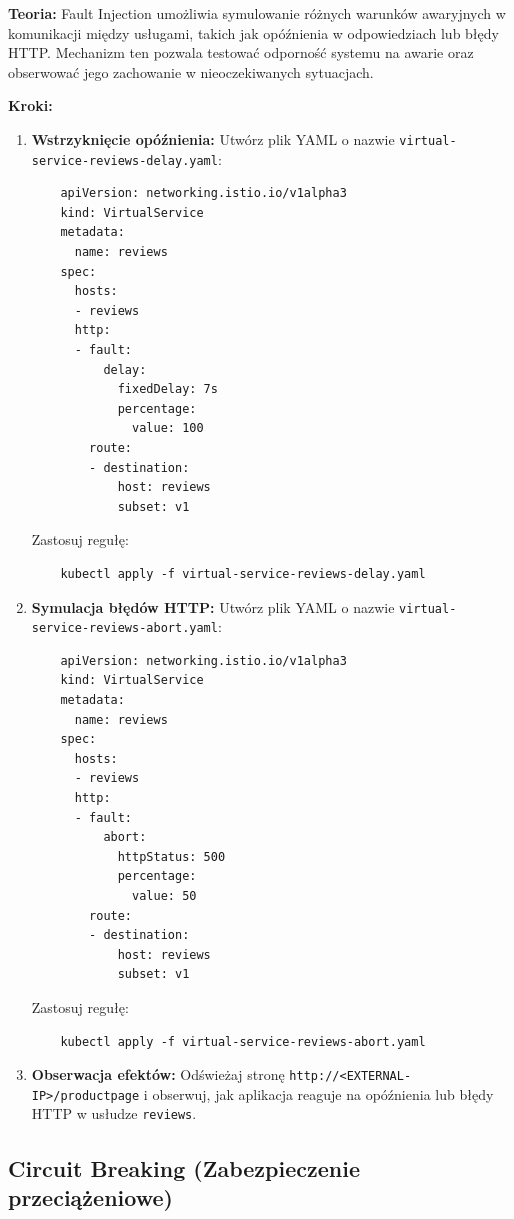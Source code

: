\documentclass{article}
\begin{document}
\textbf{Teoria:}  
Fault Injection umożliwia symulowanie różnych warunków awaryjnych w komunikacji między usługami, takich jak opóźnienia w odpowiedziach lub błędy HTTP. Mechanizm ten pozwala testować odporność systemu na awarie oraz obserwować jego zachowanie w nieoczekiwanych sytuacjach.

\textbf{Kroki:}
\begin{enumerate}
    \item \textbf{Wstrzyknięcie opóźnienia:}  
    Utwórz plik YAML o nazwie \texttt{virtual-service-reviews-delay.yaml}:
    \begin{lstlisting}
    apiVersion: networking.istio.io/v1alpha3
    kind: VirtualService
    metadata:
      name: reviews
    spec:
      hosts:
      - reviews
      http:
      - fault:
          delay:
            fixedDelay: 7s
            percentage:
              value: 100
        route:
        - destination:
            host: reviews
            subset: v1
    \end{lstlisting}
    Zastosuj regułę:
    \begin{lstlisting}
    kubectl apply -f virtual-service-reviews-delay.yaml
    \end{lstlisting}

    \item \textbf{Symulacja błędów HTTP:}  
    Utwórz plik YAML o nazwie \texttt{virtual-service-reviews-abort.yaml}:
    \begin{lstlisting}
    apiVersion: networking.istio.io/v1alpha3
    kind: VirtualService
    metadata:
      name: reviews
    spec:
      hosts:
      - reviews
      http:
      - fault:
          abort:
            httpStatus: 500
            percentage:
              value: 50
        route:
        - destination:
            host: reviews
            subset: v1
    \end{lstlisting}
    Zastosuj regułę:
    \begin{lstlisting}
    kubectl apply -f virtual-service-reviews-abort.yaml
    \end{lstlisting}

    \item \textbf{Obserwacja efektów:}  
    Odświeżaj stronę \texttt{http://<EXTERNAL-IP>/productpage} i obserwuj, jak aplikacja reaguje na opóźnienia lub błędy HTTP w usłudze \texttt{reviews}.
\end{enumerate}

\subsection{Circuit Breaking (Zabezpieczenie przeciążeniowe)}
\end{document}
